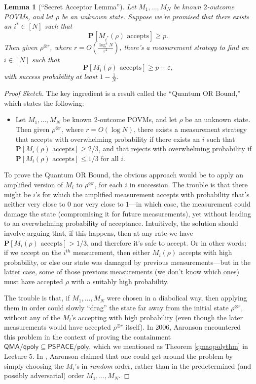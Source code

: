 \documentclass[11pt]{report}
\theoremstyle{plain}
\newtheorem{lemma}[theorem]{Lemma}
\theoremstyle{definition}
\newcommand{\eps}{\varepsilon}
\renewcommand{\Pr}{\mathbf{P}}
\begin{document}
\begin{lemma}[``Secret Acceptor Lemma'']
\label{secretacc}
Let $M_1,\ldots,M_N$ be known $2$-outcome POVMs, and let $\rho$ be an unknown state.  Suppose we're promised that there exists an $i^{*} \in [N]$ such that
$$\Pr[M_{i^{*}}(\rho)\text{ accepts}] \ge p.$$
Then given $\rho^{\otimes r}$, where $r=O\left( \frac{\log^4 N}{\eps^2} \right)$, there's a measurement strategy to find an $i \in [N]$ such that
$$\Pr[M_{i}(\rho)\text{ accepts}] \ge p - \eps,$$
with success probability at least $1-\frac{1}{N}$.
\end{lemma}
\begin{proof}[Proof Sketch]
The key ingredient is a result called the ``Quantum OR Bound,'' which states the following:
\begin{itemize}
\item Let $M_1,\ldots,M_N$ be known $2$-outcome POVMs, and let $\rho$ be an unknown state.  Then given $\rho^{\otimes r}$, where $r=O(\log N)$, there exists a measurement strategy that accepts with overwhelming probability if there exists an $i$ such that $\Pr[M_{i}(\rho)\text{ accepts}] \ge 2/3$, and that rejects with overwhelming probability if $\Pr[M_{i}(\rho)\text{ accepts}] \le 1/3$ for all $i$.
\end{itemize}
To prove the Quantum OR Bound, the obvious approach would be to apply an amplified version of $M_i$ to $\rho^{\otimes r}$, for each $i$ in succession.  The trouble is that there might be $i$'s for which the amplified measurement accepts with probability that's neither very close to $0$ nor very close to $1$---in which case, the measurement could damage the state (compromising it for future measurements), yet without leading to an overwhelming probability of acceptance.  Intuitively, the solution should involve arguing that, if this happens, then at any rate we have $\Pr[M_{i}(\rho)\text{ accepts}] > 1/3$, and therefore it's safe to accept.  Or in other words: if we accept on the $i^{th}$ measurement, then either $M_i(\rho)$ accepts with high probability, or else our state was damaged by previous measurements---but in the latter case, some of those previous measurements (we don't know which ones) must have accepted $\rho$ with a suitably high probability.

The trouble is that, if $M_1,\ldots,M_N$ were chosen in a diabolical way, then applying them in order could slowly ``drag'' the state far away from the initial state $\rho^{\otimes r}$, without any of the $M_i$'s accepting with high probability (even though the later measurements would have accepted $\rho^{\otimes r}$ itself).  In 2006, Aaronson \cite{aar:qmaqpoly} encountered this problem in the context of proving the containment $\mathsf{QMA/qpoly} \subseteq \mathsf{PSPACE/poly}$, which we mentioned as Theorem \ref{qmaqpolythm} in Lecture 5.  In \cite{aar:qmaqpoly}, Aaronson claimed that one could get around the problem by simply choosing the $M_i$'s in {\em random} order, rather than in the predetermined (and possibly adversarial) order $M_1,\ldots,M_N$.


\end{proof}
\end{document}
